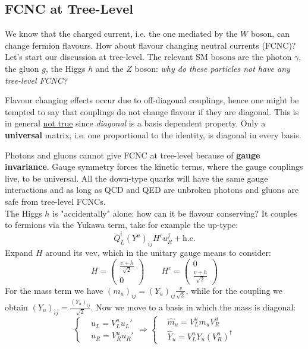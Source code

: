 \documentclass[../main.tex]{subfiles}
\begin{document}
\subsection{FCNC at Tree-Level}
We know that the charged current, i.e. the one mediated by the $W$ boson, can change fermion flavours. How about flavour changing neutral currents (FCNC)? Let's start our discussion at tree-level. The relevant SM bosons are the photon $\gamma$, the gluon $g$, the Higgs $h$ and the $Z$ boson: \textit{why do these particles not have any tree-level FCNC?}\\
\begin{kaobox}[frametitle=Remark]
Flavour changing effects occur due to off-diagonal couplings, hence one might be tempted to say that couplings do not change flavour if they are diagonal. This is in general \underline{not true} since \textit{diagonal} is a basis dependent property. Only a \textbf{universal} matrix, i.e. one proportional to the identity, is diagonal in every basis.
\end{kaobox}
Photons and gluons cannot give FCNC at tree-level because of \textbf{gauge invariance}. Gauge symmetry forces the kinetic terms, where the gauge couplings live, to be universal. All the down-type quarks will have the same gauge interactions and as long as QCD and QED are unbroken photons and gluons are safe from tree-level FCNCs.\\
The Higgs $h$ is "accidentally" alone: how can it be flavour conserving? It couples to fermions via the Yukawa term, take for example the up-type: 
\[
\overline{Q}_L^i(Y^u)_{ij}H^cu_R^j+\text{h.c.}
\]
Expand $H$ around its vev, which in the unitary gauge means to consider:
\[
H=\left(\begin{array}{c}
    \frac{v+h}{\sqrt{2}} \\
    0
\end{array}\right)
\qquad
H^c=\left(\begin{array}{c}
    0\\
    \frac{v+h}{\sqrt{2}}
\end{array}\right)
\]
For the mass term we have $(m_u)_{ij}=(Y_u)_{ij}\frac{v}{\sqrt{2}}$, while for the coupling we obtain $(Y_u)_{ij}=\frac{(Y_u)_{ij}}{\sqrt{2}}$. Now we move to a basis in which the mass is diagonal:
\[
\left\{
\begin{aligned}
&u_L=V_L^uu_L'\\
&u_R=V_R^uu_R'
\end{aligned}
\right.
\Rightarrow
\left\{
\begin{aligned}
&\hat{m}_u=V_L^um_uV_R^u\\
&\hat{Y}_u=V_L^uY_u(V_R^u)^\dagger
\end{aligned}
\right.
\]
\end{document}
